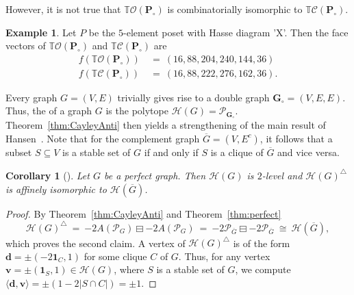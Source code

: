 \documentclass[11pt]{amsart}
\newtheorem{cor}[thm]{Corollary}
\theoremstyle{definition}
\newtheorem{example}{Example}
\begin{document}
However, it is not true that ${{\mathbb{T}}{\mathcal{O}({{{\mathbf{P}}_\circ}})}}$ is combinatorially isomorphic
to ${{\mathbb{T}}{\mathcal{C}({{{{\mathbf{P}}_\circ}}})}}$.

\begin{example}
    Let ${P}$ be the $5$-element poset with Hasse diagram 'X'. Then the face
    vectors of ${{\mathbb{T}}{\mathcal{O}({{{\mathbf{P}}_\circ}})}}$ and ${{\mathbb{T}}{\mathcal{C}({{{{\mathbf{P}}_\circ}}})}}$ are
    \begin{align*}
            f({{\mathbb{T}}{\mathcal{O}({{{\mathbf{P}}_\circ}})}}) \ &= \ (16, 88, 204, 240, 144, 36) \\
            f({{\mathbb{T}}{\mathcal{C}({{{{\mathbf{P}}_\circ}}})}}) \ &= \ (16, 88, 222, 276, 162, 36).
    \end{align*}
\end{example}

Every graph $G = (V,E)$ trivially gives rise to a double graph ${\mathbf{G}}_\circ =
(V,E,E)$. Thus, the {\textbf{\color{black}{Hansen polytope}}} of a graph $G$ is the polytope
${\mathcal{H}({G})} = {\mathcal{P}}_{{\mathbf{G}}_\circ}$. Theorem~\ref{thm:CayleyAnti} then yields a
strengthening of the main result of Hansen~\cite{Hansen}. Note that for the
complement graph $\overline{G} = (V,E^c)$, it follows that a subset $S
\subseteq V$ is a stable set of $G$ if and only if $S$ is a clique of
$\overline{G}$ and vice versa.  

\begin{cor}[{\cite[Thm.~XX]{Hansen}}]\label{cor:Hansen}
    Let $G$ be a perfect graph. Then ${\mathcal{H}({G})}$ is $2$-level and
    ${\mathcal{H}({G})}^{\triangle}$ is affinely isomorphic to ${\mathcal{H}({\overline{G}})}$.
\end{cor}
\begin{proof}
    By Theorem~\ref{thm:CayleyAnti} and Theorem~\ref{thm:perfect}
    \[
        {\mathcal{H}({G})}^{\triangle} \ = \ {{{-2{A({{{\mathcal{P}}_G}})}} \boxminus {-2{A({{{\mathcal{P}}_G}})}}}} \ = \
        {{{-2{\mathcal{P}}_{\overline{G}}} \boxminus {-2{\mathcal{P}}_{\overline{G}}}}} \ \cong \
        {\mathcal{H}({\overline{G}})},
    \]
    which proves the second claim. A vertex of ${\mathcal{H}({G})}^{\triangle}$ is of the
    form ${\mathbf{d}} = \pm(-2{\mathbf{1}}_C,1)$ for some clique
    $C$ of $G$. Thus, for any vertex ${\mathbf{v}} = \pm({\mathbf{1}}_S,1) \in {\mathcal{H}({G})}$, where
    $S$ is a stable set of $G$, we compute ${\langle{{{\mathbf{d}},{\mathbf{v}}}}\rangle} = \pm( 1 - 2|S \cap
    C|) = \pm 1$.
\end{proof}
\end{document}
